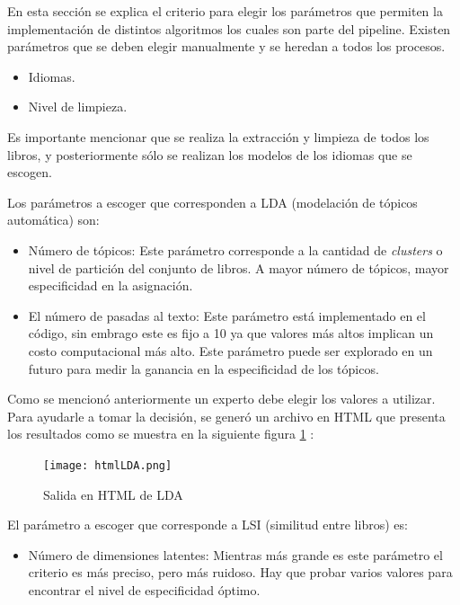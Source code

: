 En esta sección se explica el criterio para elegir los parámetros que permiten la implementación de distintos algoritmos los cuales son parte del pipeline. Existen parámetros que se deben elegir manualmente y se heredan a todos los procesos. 

\begin{itemize}
	\item Idiomas. 
	\item Nivel de limpieza.
\end{itemize} 

Es importante mencionar que se realiza la extracción y limpieza de todos los libros, y posteriormente sólo se realizan los modelos de los idiomas que se escogen.
\vspace{0.2cm}

\noindent Los parámetros a escoger que corresponden a LDA (modelación de tópicos automática) son:

\begin{itemize}
	\item Número de tópicos: Este parámetro corresponde a la cantidad de \textit{clusters} o nivel de partición del conjunto de libros. A mayor número de tópicos, mayor especificidad en  la asignación.
	\item El número de pasadas al texto: Este parámetro está implementado en el código, 
	sin embrago este es fijo a 10 ya que valores más altos implican un costo computacional más alto.
	Este parámetro puede ser explorado en un futuro para medir la ganancia en la especificidad de los tópicos.
\end{itemize}


Como se mencionó anteriormente un experto debe elegir los valores a utilizar. Para ayudarle a tomar la decisión, se generó un archivo en HTML que presenta los resultados como se muestra en la siguiente figura \ref{fig:outputLDA} :
\vspace{0.2cm}


\begin{figure}[h]\centering
\texttt{[image: htmlLDA.png]}
\caption{Salida en HTML de LDA}
\label{fig:outputLDA}
\end{figure}


\vspace{0.2cm}
El parámetro a escoger que corresponde a LSI (similitud entre libros) es:

\begin{itemize}
	\item Número de dimensiones latentes: Mientras más grande es este parámetro el criterio es más preciso, pero más ruidoso. Hay que probar varios valores para encontrar el nivel de especificidad óptimo. 
\end{itemize}



